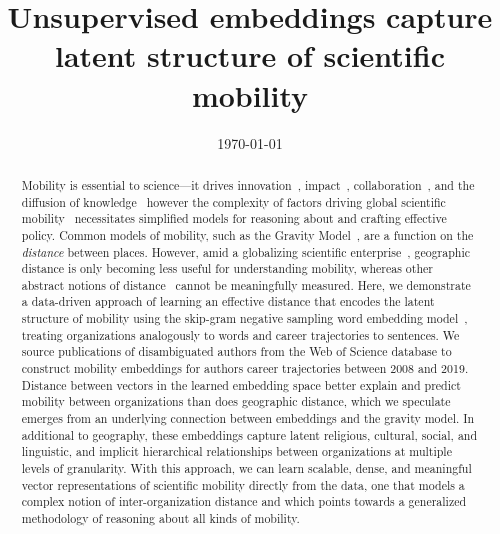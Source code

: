 \documentclass[12pt]{article} %
\begin{document}

\title{Unsupervised embeddings capture latent structure of scientific mobility} %
\date{\today}
\maketitle %

%
%

\begin{abstract}

Mobility is essential to science---it drives innovation~\autocite{braunerhjelm2020labor, kaiser2018innovation, armano2017innovation}, impact~\autocite{sugimoto2017mostimpact, petersen2018multiscale, jonkers2013return, franzoni2014advantage}, collaboration~\autocite{rodrigues2016mobility}, and the diffusion of knowledge~\autocite{braunerhjelm2020labor, azoulay2011diffusion, morgan2018prestige} however the complexity of factors driving global scientific mobility~\autocite{robinson2019mobility, vannoorden2012mobility, deville2014career, ackers2008mobility, scott2015dynamics} necessitates simplified models for reasoning about and crafting effective policy. 
Common models of mobility, such as the Gravity Model~\autocite{curiel2018citygravity, lewer2008immigrationgravity, jung2008highwaygravity, hong2016busgravity, truscott2012epidemicgravity, xia2005measlesgravity, simini2012universal}, are a function on the \textit{distance} between places.
However, amid a globalizing scientific enterprise~\autocite{czaika2018globalisation}, geographic distance is only becoming less useful for understanding mobility, whereas other abstract notions of distance~\autocite{boschma2005proximity} cannot be meaningfully measured.
Here, we demonstrate a data-driven approach of learning an effective distance that encodes the latent structure of mobility using the skip-gram  negative sampling word embedding model~\autocite{mikolov2013word2vec}, treating organizations analogously to words and career trajectories to sentences.
We source publications of disambiguated authors from the Web of Science database to construct mobility embeddings for authors career trajectories between 2008 and 2019. 
Distance between vectors in the learned embedding space better explain and predict mobility between organizations than does geographic distance, which we speculate emerges from an underlying connection between embeddings and the gravity model.
In additional to geography, these embeddings capture latent religious, cultural, social, and linguistic, and implicit hierarchical relationships between organizations at multiple levels of granularity.
With this approach, we can learn scalable, dense, and meaningful vector representations of scientific mobility directly from the data, one that models a complex notion of inter-organization distance and which points towards a generalized methodology of reasoning about all kinds of mobility. 

\end{abstract}
\end{document}
